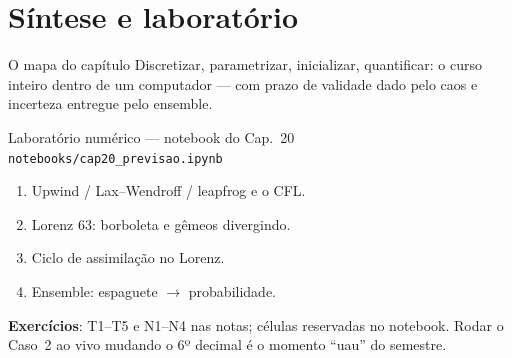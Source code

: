 \documentclass[aspectratio=169,11pt]{beamer}
\begin{document}
\section{Síntese e laboratório}

\begin{frame}{O mapa do capítulo}
  \vspace{0.6em}
  Discretizar, parametrizar, inicializar, quantificar: o curso inteiro
  dentro de um computador — com prazo de validade dado pelo caos e
  incerteza entregue pelo ensemble.
\end{frame}

\begin{frame}{Laboratório numérico --- notebook do Cap.~20}
  \texttt{notebooks/cap20\_previsao.ipynb}
  \begin{enumerate}
    \item Upwind / Lax--Wendroff / leapfrog e o CFL.
    \item Lorenz 63: borboleta e gêmeos divergindo.
    \item Ciclo de assimilação no Lorenz.
    \item Ensemble: espaguete $\to$ probabilidade.
  \end{enumerate}
  \vspace{0.4em}
  \textbf{Exercícios}: T1--T5 e N1--N4 nas notas; células reservadas no
  notebook. Rodar o Caso~2 ao vivo mudando o 6º decimal é o momento
  ``uau'' do semestre.
  \vfill
  \atribuicao
\end{frame}
\end{document}
